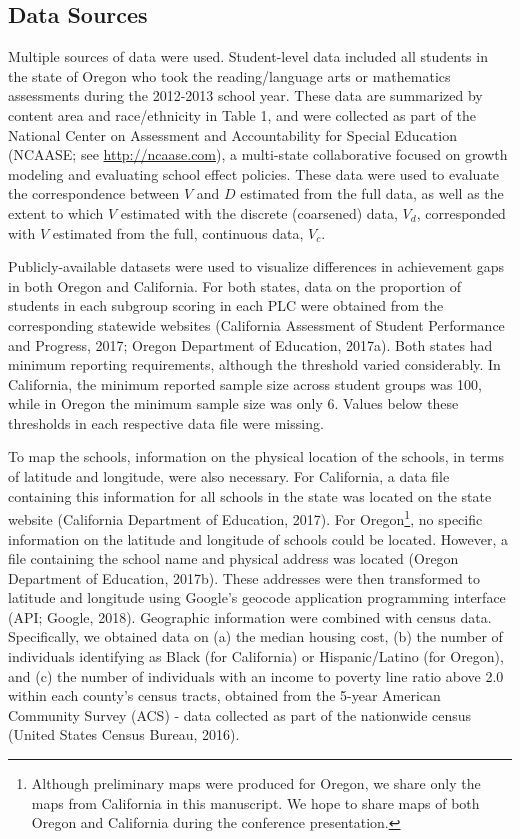 \documentclass[man, fleqn, noextraspace]{apa6}
\theoremstyle{definition}
\theoremstyle{definition}
\theoremstyle{definition}
\theoremstyle{remark}
\begin{document}
\hypertarget{data-sources}{%
\subsection{Data Sources}\label{data-sources}}

Multiple sources of data were used. Student-level data included all
students in the state of Oregon who took the reading/language arts or
mathematics assessments during the 2012-2013 school year. These data are
summarized by content area and race/ethnicity in Table 1, and were
collected as part of the National Center on Assessment and
Accountability for Special Education (NCAASE; see
\url{http://ncaase.com}), a multi-state collaborative focused on growth
modeling and evaluating school effect policies. These data were used to
evaluate the correspondence between \(V\) and \(D\) estimated from the
full data, as well as the extent to which \(V\) estimated with the
discrete (coarsened) data, \(V_{d}\), corresponded with \(V\) estimated
from the full, continuous data, \(V_{c}\).

Publicly-available datasets were used to visualize differences in
achievement gaps in both Oregon and California. For both states, data on
the proportion of students in each subgroup scoring in each PLC were
obtained from the corresponding statewide websites (California
Assessment of Student Performance and Progress, 2017; Oregon Department
of Education, 2017a). Both states had minimum reporting requirements,
although the threshold varied considerably. In California, the minimum
reported sample size across student groups was 100, while in Oregon the
minimum sample size was only 6. Values below these thresholds in each
respective data file were missing.

To map the schools, information on the physical location of the schools,
in terms of latitude and longitude, were also necessary. For California,
a data file containing this information for all schools in the state was
located on the state website (California Department of Education, 2017).
For Oregon\footnote{Although preliminary maps were produced for Oregon,
  we share only the maps from California in this manuscript. We hope to
  share maps of both Oregon and California during the conference
  presentation.}, no specific information on the latitude and longitude
of schools could be located. However, a file containing the school name
and physical address was located (Oregon Department of Education,
2017b). These addresses were then transformed to latitude and longitude
using Google's geocode application programming interface (API; Google,
2018). Geographic information were combined with census data.
Specifically, we obtained data on (a) the median housing cost, (b) the
number of individuals identifying as Black (for California) or
Hispanic/Latino (for Oregon), and (c) the number of individuals with an
income to poverty line ratio above 2.0 within each county's census
tracts, obtained from the 5-year American Community Survey (ACS) - data
collected as part of the nationwide census (United States Census Bureau,
2016).
\end{document}
